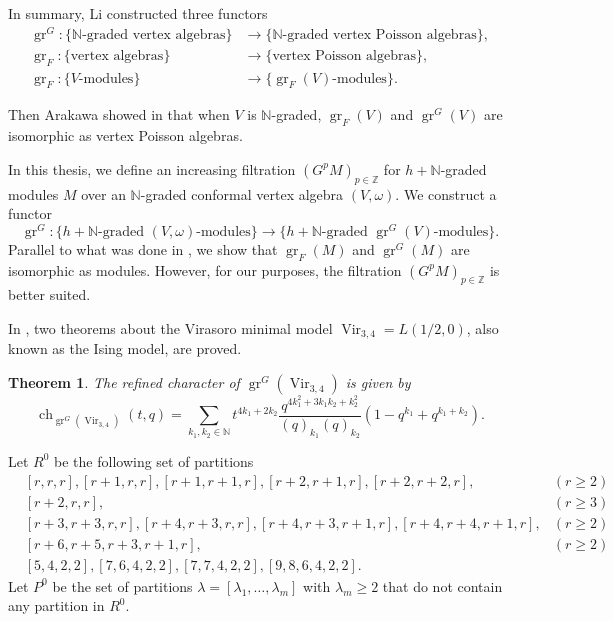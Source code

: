 \documentclass[a4paper, 12pt, reqno]{amsart}
\newtheorem{theorem}{Theorem}[section]
\theoremstyle{remark}
\numberwithin{equation}{subsection}
\DeclareMathOperator{\Vir}{Vir}
\DeclareMathOperator{\gr}{gr}
\DeclareMathOperator{\ch}{ch}
\begin{document}
In summary, Li constructed three functors
\begin{align*}
  \gr^G: \{\text{$\mathbb{N}$-graded vertex algebras}\} &\to \{\text{$\mathbb{N}$-graded vertex Poisson algebras}\}, \\
  \gr_F: \{\text{vertex algebras}\} &\to \{\text{vertex Poisson algebras}\}, \\
  \gr_F: \{\text{$V$-modules}\} &\to \{\text{$\gr_F(V)$-modules}\}.
\end{align*}

Then Arakawa showed in \cite[Proposition 2.6.1]{arakawa_remark_2012} that when $V$ is $\mathbb{N}$-graded, $\gr_F(V)$ and $\gr^G(V)$ are isomorphic as vertex Poisson algebras.

In this thesis, we define an increasing filtration $(G^pM)_{p \in \mathbb{Z}}$ for $h + \mathbb{N}$-graded modules $M$ over an $\mathbb{N}$-graded conformal vertex algebra $(V, \omega)$.
We construct a functor
\begin{equation*}
  \gr^G: \{\text{$h + \mathbb{N}$-graded $(V, \omega)$-modules}\} \to \{\text{$h + \mathbb{N}$-graded $\gr^G(V)$-modules}\}.
\end{equation*}
Parallel to what was done in \cite{arakawa_remark_2012}, we show that $\gr_F(M)$ and $\gr^G(M)$ are isomorphic as modules.
However, for our purposes, the filtration $(G^pM)_{p \in \mathbb{Z}}$ is better suited.

In \cite{andrews_singular_2022}, two theorems about the Virasoro minimal model $\Vir_{3, 4} = L(1/2, 0)$, also known as the Ising model, are proved.

\begin{theorem}
  \label{thr:1}
  The refined character of $\gr^G(\Vir_{3,4})$ is given by
  \begin{equation*}
    \ch_{\gr^G(\Vir_{3, 4})}(t, q) = \sum_{k_1, k_2 \in \mathbb{N}}t^{4k_1 + 2k_2}\frac{q^{4k_1^2 + 3k_1k_2 + k_2^2}}{(q)_{k_1}(q)_{k_2}}(1 - q^{k_1} + q^{k_1 + k_2}).
  \end{equation*}
\end{theorem}

Let $R^0$ be the following set of partitions
\begin{align*}
  &[r, r, r], [r + 1, r, r], [r + 1, r + 1, r], [r + 2, r + 1, r], [r + 2, r + 2, r], &(r \ge 2) \\
  &[r + 2, r, r], &(r \ge 3) \\
  &[r + 3, r + 3, r, r], [r + 4, r + 3, r, r],  [r + 4, r + 3, r + 1, r], [r + 4, r + 4, r + 1, r], &(r \ge 2) \\
  &[r + 6, r + 5, r + 3, r + 1, r], &(r \ge 2) \\
  &[5, 4, 2, 2], [7, 6, 4, 2, 2], [7, 7, 4, 2, 2], [9, 8, 6, 4, 2, 2].
\end{align*}
Let $P^0$ be the set of partitions $\lambda = [\lambda_1, \dots, \lambda_m]$ with $\lambda_m \ge 2$ that do not contain any partition in $R^0$.
\end{document}
